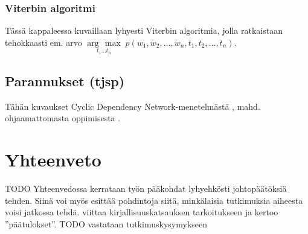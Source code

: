 \documentclass[utf8,bachelor,manualbib]{gradu3}
\newcommand{\argmax}[1]{\underset{#1}{\operatorname{arg}\,\operatorname{max}}\;}
\begin{document}
\subsection{Viterbin algoritmi}

Tässä kappaleessa kuvaillaan lyhyesti Viterbin algoritmia, jolla ratkaistaan tehokkaasti em. arvo $\argmax{t_1 \ldots t_n} p(w_1, w_2, \ldots, w_n, t_1, t_2, \ldots, t_n)$.

\section{Parannukset (tjsp)}

Tähän kuvaukset Cyclic Dependency Network-menetelmästä \citep{toutanova2003}, mahd. ohjaamattomasta oppimisesta \citep{banko2004}. 


\chapter{Yhteenveto}

TODO Yhteenvedossa kerrataan työn pääkohdat lyhyehkösti johtopäätöksiä tehden. Siinä voi myös esittää pohdintoja siitä, minkälaisia tutkimuksia aiheesta voisi jatkossa tehdä. viittaa kirjallisuuskatsauksen tarkoitukseen ja kertoo ''päätulokset''.
TODO vastataan tutkimuskysymykseen
\end{document}
